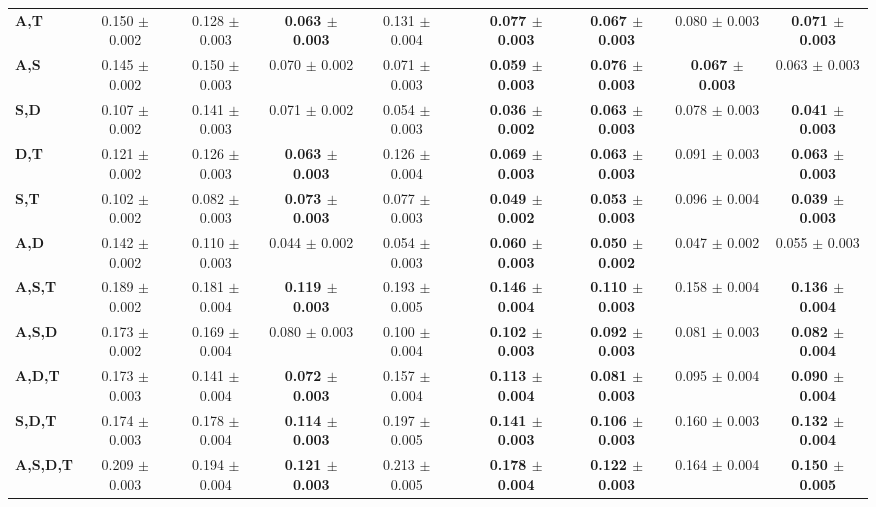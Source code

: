 \begin{table}[!htbp]
\begin{adjustbox}{angle=90}
\begin{tabular}{l|c|c|c|c|c|c|c|c|c|}
			\textbf{A,T} & 0.150 $\pm$ 0.002 & 0.128 $\pm$ 0.003 & \textbf{0.063 $\pm$ 0.003} & 0.131 $\pm$ 0.004 &  & \textbf{0.077 $\pm$ 0.003} & \textbf{0.067 $\pm$ 0.003} & 0.080 $\pm$ 0.003 & \textbf{0.071 $\pm$ 0.003} \\
			\textbf{A,S} & 0.145 $\pm$ 0.002 & 0.150 $\pm$ 0.003 & 0.070 $\pm$ 0.002 & 0.071 $\pm$ 0.003 &  & \textbf{0.059 $\pm$ 0.003} & \textbf{0.076 $\pm$ 0.003} & \textbf{0.067 $\pm$ 0.003 } & 0.063 $\pm$ 0.003 \\
			\textbf{S,D} & 0.107 $\pm$ 0.002 & 0.141 $\pm$ 0.003 & 0.071 $\pm$ 0.002 & 0.054 $\pm$ 0.003 &  & \textbf{0.036 $\pm$ 0.002} & \textbf{0.063 $\pm$ 0.003} & 0.078  $\pm$ 0.003 & \textbf{0.041 $\pm$ 0.003} \\
			\textbf{D,T} & 0.121 $\pm$ 0.002 & 0.126 $\pm$ 0.003 & \textbf{0.063 $\pm$ 0.003} & 0.126 $\pm$ 0.004 &  & \textbf{0.069 $\pm$ 0.003} & \textbf{0.063 $\pm$ 0.003} & 0.091  $\pm$ 0.003 & \textbf{0.063 $\pm$ 0.003} \\
			\textbf{S,T} & 0.102 $\pm$ 0.002 & 0.082 $\pm$ 0.003 & \textbf{0.073 $\pm$ 0.003} & 0.077 $\pm$ 0.003 &  & \textbf{0.049 $\pm$ 0.002} & \textbf{0.053 $\pm$ 0.003} & 0.096  $\pm$ 0.004 & \textbf{0.039 $\pm$ 0.003} \\
			\textbf{A,D} & 0.142 $\pm$ 0.002 & 0.110 $\pm$ 0.003 & 0.044 $\pm$ 0.002 & 0.054 $\pm$ 0.003 &  & \textbf{0.060 $\pm$ 0.003} & \textbf{0.050 $\pm$ 0.002} & 0.047  $\pm$ 0.002 & 0.055 $\pm$ 0.003 \\ \hline
			\textbf{A,S,T} & 0.189 $\pm$ 0.002 & 0.181 $\pm$ 0.004 & \textbf{0.119 $\pm$ 0.003} & 0.193 $\pm$ 0.005 &  & \textbf{0.146 $\pm$ 0.004} & \textbf{0.110 $\pm$ 0.003} & 0.158  $\pm$ 0.004 & \textbf{0.136 $\pm$ 0.004} \\
			\textbf{A,S,D} & 0.173 $\pm$ 0.002 & 0.169 $\pm$ 0.004 & 0.080 $\pm$ 0.003 & 0.100 $\pm$ 0.004 &  & \textbf{0.102 $\pm$ 0.003} & \textbf{0.092 $\pm$ 0.003} & 0.081  $\pm$ 0.003 & \textbf{0.082 $\pm$ 0.004} \\
			\textbf{A,D,T} & 0.173 $\pm$ 0.003 & 0.141 $\pm$ 0.004 & \textbf{0.072 $\pm$ 0.003} & 0.157 $\pm$ 0.004 &  & \textbf{0.113 $\pm$ 0.004} & \textbf{0.081 $\pm$ 0.003} & 0.095  $\pm$ 0.004 & \textbf{0.090 $\pm$ 0.004} \\
			\textbf{S,D,T} & 0.174 $\pm$ 0.003 & 0.178 $\pm$ 0.004 & \textbf{0.114 $\pm$ 0.003} & 0.197 $\pm$ 0.005 &  & \textbf{0.141 $\pm$ 0.003} & \textbf{0.106 $\pm$ 0.003} & 0.160  $\pm$ 0.003 & \textbf{0.132 $\pm$ 0.004} \\ \hline
			\textbf{A,S,D,T} & 0.209 $\pm$ 0.003 & 0.194 $\pm$ 0.004 & \textbf{0.121 $\pm$ 0.003} & 0.213 $\pm$ 0.005 &  & \textbf{0.178 $\pm$ 0.004} & \textbf{0.122 $\pm$ 0.003} & 0.164  $\pm$ 0.004 & \textbf{0.150 $\pm$ 0.005} \\
		\end{tabular}
	\end{adjustbox}
\end{table}



